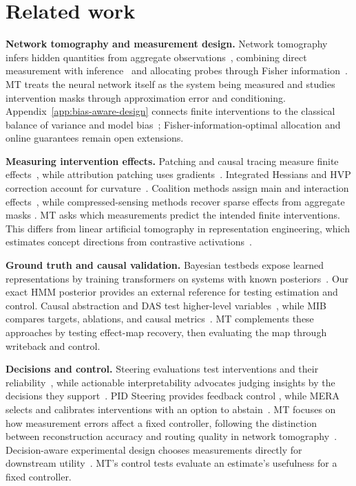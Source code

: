 \documentclass[sigconf,10pt,nonacm,balance=false]{acmart}
\begin{document}
\FloatBarrier
\section{Related work}

\textbf{Network tomography and measurement design.} Network tomography infers hidden quantities from aggregate observations~\cite{vardi1996tomo,firooz2010cs}, combining direct measurement with inference~\cite{soule2005traffic} and allocating probes through Fisher information~\cite{he2015design}. MT treats the neural network itself as the system being measured and studies intervention masks through approximation error and conditioning. Appendix~\ref{app:bias-aware-design} connects finite interventions to the classical balance of variance and model bias~\cite{box1959design}; Fisher-information-optimal allocation and online guarantees remain open extensions.

\textbf{Measuring intervention effects.} Patching and causal tracing measure finite effects~\cite{meng2022rome,zhang2024patching}, while attribution patching uses gradients~\cite{syed2024attrib}. Integrated Hessians and HVP correction account for curvature~\cite{janizek2020integrated,zhang2026lies}. Coalition methods assign main and interaction effects~\cite{lundberg2017shap,tsai2023faithshap}, while compressed-sensing methods recover sparse effects from aggregate masks \cite{bair2026compressed,kang2025spex,butler2025proxyspex}. MT asks which measurements predict the intended finite interventions. This differs from linear artificial tomography in representation engineering, which estimates concept directions from contrastive activations~\cite{zou2023repeng,wu2025axbench}.

\textbf{Ground truth and causal validation.} Bayesian testbeds expose learned representations by training transformers on systems with known posteriors~\cite{agarwal2025geometry,shai2024belief}. Our exact HMM posterior provides an external reference for testing estimation and control. Causal abstraction and DAS test higher-level variables~\cite{geiger2024das,geiger2025causal}, while MIB compares targets, ablations, and causal metrics~\cite{mueller2025mib}. MT complements these approaches by testing effect-map recovery, then evaluating the map through writeback and control.

\textbf{Decisions and control.} Steering evaluations test interventions and their reliability~\cite{bhalla2025unifying,wu2025axbench,tan2024steering}, while actionable interpretability advocates judging insights by the decisions they support~\cite{orgad2026actionable}. PID Steering provides feedback control \cite{nguyen2025pid}, while MERA selects and calibrates interventions with an option to abstain~\cite{hedstrom2025mera}. MT focuses on how measurement errors affect a fixed controller, following the distinction between reconstruction accuracy and routing quality in network tomography~\cite{roughan2003te}. Decision-aware experimental design chooses measurements directly for downstream utility~\cite{huang2024decisiondesign,go2026goboed}. MT's control tests evaluate an estimate's usefulness for a fixed controller.
\end{document}
